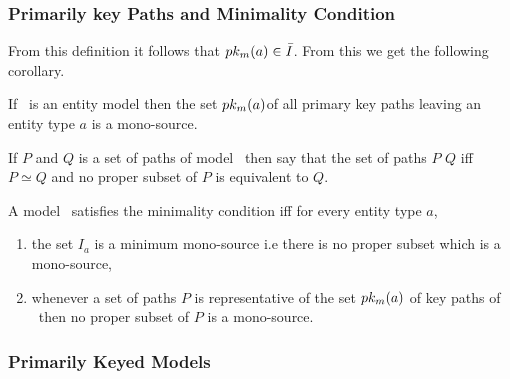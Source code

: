 \subsubsection{Primarily key Paths and Minimality Condition}
\label{minimalitycondition}
 From this definition it follows that $pk_{{m}}(a) \in \bar{I}$. From this we get the following corollary.


\begin{corollary}
\label{primarykeycorallary}
If \genericmodel\ is an entity model then the set $pk_{{m}}(a)$of all primary key paths 
leaving an entity type $a$ is a mono-source.
\end{corollary}


\begin{definition}
If $P$ and $Q$ is a set of paths of model \genericmodel\ then say that the set of paths $P$ 
 $Q$ 
iff $P \simeq Q$ and no proper subset of $P$ is equivalent to $Q$.
\end{definition}

\begin{definition}
A model \genericmodel\ satisfies the minimality condition iff for every entity type $a$,
\begin{enumerate}
\item the set $I_a$ is a minimum mono-source i.e 
there is no proper subset which is a mono-source,
\item whenever a set of paths $P$ is representative
of the set $pk_{{m}}(a)$  of key paths of \genericmodel\ then no proper subset of $P$ is a mono-source.
\end{enumerate}
\end{definition}

\subsubsection{Primarily Keyed Models}

